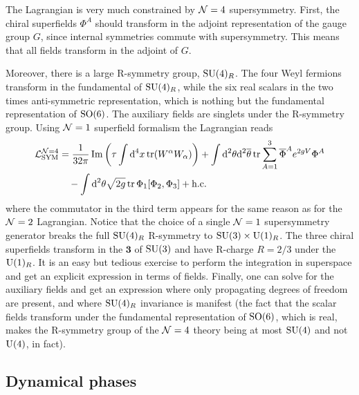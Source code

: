 \documentclass[a4paper,10pt]{article}
\begin{document}
        The Lagrangian is very much constrained by $\mathcal{N} = 4$ supersymmetry. First, the chiral superfields $\Phi^A$ should transform in the adjoint representation of the gauge group $G$, since internal symmetries commute with supersymmetry. This means that all fields transform in the adjoint of $G$.
        
        Moreover, there is a large R-symmetry group, $\text{SU}(4)_R$. The four Weyl fermions transform in the fundamental of $\text{SU}(4)_R$, while the six real scalars in the two times anti-symmetric representation, which is nothing but the fundamental representation of $\text{SO}(6)$. The auxiliary fields are singlets under the R-symmetry group. Using $\mathcal{N} = 1$ superfield formalism the Lagrangian reads
        \begin{align}
            \begin{split}
                \mathcal{L}^{\mathcal{N}=4}_{\text{SYM}} &= \frac{1}{32\pi}\Im \left(\tau\int\text{d}^4x\tr(W^\alpha W_\alpha)\right)+\int\text{d}^2\theta\text{d}^2\overline{\theta}\tr\sum^3_{A=1}\overline{\Phi}^Ae^{2gV}\Phi^A\\
                &\quad-\int\text{d}^2\theta\sqrt{2g}\tr\Phi_1[\Phi_2,\Phi_3]+\text{h.c.}
            \end{split}\label{eq:N4lag}
        \end{align}
        where the commutator in the third term appears for the same reason as for the $\mathcal{N} = 2$ Lagrangian. Notice that the choice of a single $\mathcal{N} = 1$ supersymmetry generator breaks the full $\text{SU}(4)_R$ R-symmetry to $\text{SU}(3)\times \text{U}(1)_R$. The three chiral superfields transform in the $\boldsymbol{3}$ of $\text{SU}(3)$ and have R-charge $R = 2/3$ under the $\text{U}(1)_R$. It is an easy but tedious exercise to perform the integration in superspace and get an explicit expression in terms of fields. Finally, one can solve for the auxiliary fields and get an expression where only propagating degrees of freedom are present, and where $\text{SU}(4)_R$ invariance is manifest (the fact that the scalar fields transform under the fundamental representation of $\text{SO}(6)$, which is real, makes the R-symmetry group of the $\mathcal{N} = 4$ theory being at most $\text{SU}(4)$ and not $\text{U}(4)$, in fact).

    \subsection{Dynamical phases}
\end{document}
